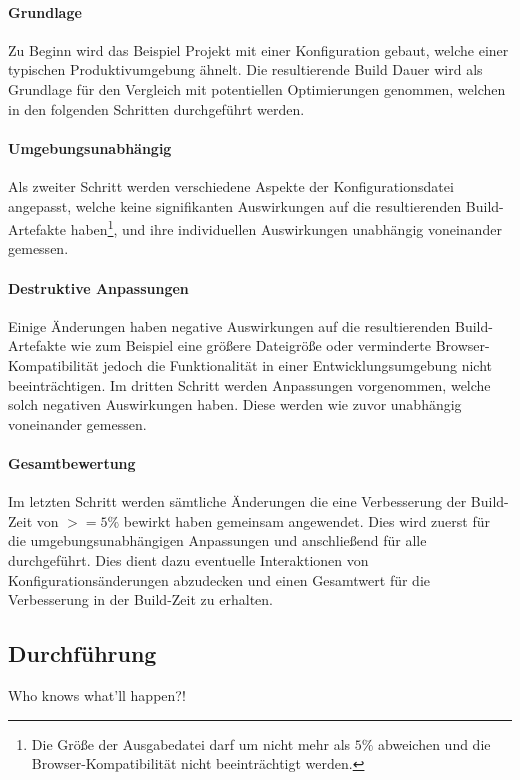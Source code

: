 \documentclass[11pt]{article}
\begin{document}
				\paragraph{Grundlage} Zu Beginn wird das Beispiel Projekt mit einer Konfiguration gebaut, welche einer typischen Produktivumgebung ähnelt. Die resultierende Build Dauer wird als Grundlage für den Vergleich mit potentiellen Optimierungen genommen, welchen in den folgenden Schritten durchgeführt werden.
				
				\paragraph{Umgebungsunabhängig} Als zweiter Schritt werden verschiedene Aspekte der Konfigurationsdatei angepasst, welche keine signifikanten Auswirkungen auf die resultierenden Build-Artefakte haben\footnote{Die Größe der Ausgabedatei darf um nicht mehr als $5\%$ abweichen und die Browser-Kompatibilität nicht beeinträchtigt werden.}, und ihre individuellen Auswirkungen unabhängig voneinander gemessen.
				
				\paragraph{Destruktive Anpassungen} Einige Änderungen haben negative Auswirkungen auf die resultierenden Build-Artefakte wie zum Beispiel eine größere Dateigröße oder verminderte Browser-Kompatibilität jedoch die Funktionalität in einer Entwicklungsumgebung nicht beeinträchtigen. Im dritten Schritt werden Anpassungen vorgenommen, welche solch negativen Auswirkungen haben. Diese werden wie zuvor unabhängig voneinander gemessen.
				
				\paragraph{Gesamtbewertung} Im letzten Schritt werden sämtliche Änderungen die eine Verbesserung der Build-Zeit von $>=5\%$ bewirkt haben gemeinsam angewendet. Dies wird zuerst für die umgebungsunabhängigen Anpassungen und anschließend für alle durchgeführt. Dies dient dazu eventuelle Interaktionen von Konfigurationsänderungen abzudecken und einen Gesamtwert für die Verbesserung in der Build-Zeit zu erhalten.
				 
		\subsection{Durchführung}
			Who knows what'll happen?! %
		
\end{document}
